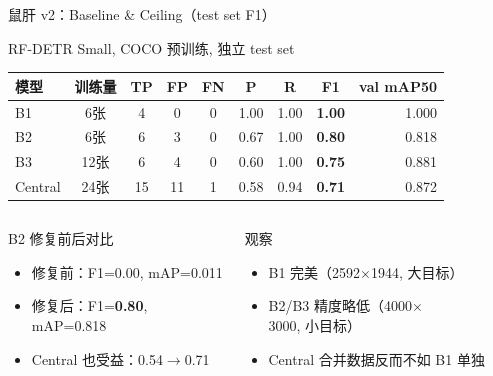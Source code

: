 \documentclass[aspectratio=169, 10pt]{beamer}
\begin{document}
\begin{frame}{鼠肝 v2：Baseline \& Ceiling（test set F1）}
  \begin{block}{RF-DETR Small, COCO 预训练, 独立 test set}
    \begin{tabular}{lcccccccr}
      \toprule
      \textbf{模型} & \textbf{训练量} & \textbf{TP} & \textbf{FP} & \textbf{FN} & \textbf{P} & \textbf{R} & \textbf{F1} & \textbf{val mAP50} \\
      \midrule
      B1 & 6张 & 4 & 0 & 0 & 1.00 & 1.00 & \textbf{1.00} & 1.000 \\
      B2 & 6张 & 6 & 3 & 0 & 0.67 & 1.00 & \textbf{0.80} & 0.818 \\
      B3 & 12张 & 6 & 4 & 0 & 0.60 & 1.00 & \textbf{0.75} & 0.881 \\
      Central & 24张 & 15 & 11 & 1 & 0.58 & 0.94 & \textbf{0.71} & 0.872 \\
      \bottomrule
    \end{tabular}
  \end{block}
  \vspace{0em}
  \begin{columns}[T]
    \begin{alertblock}{B2 修复前后对比}
      \begin{itemize}
        \item 修复前：F1=\alert{0.00}, mAP=0.011
        \item 修复后：F1=\textbf{0.80}, mAP=0.818
        \item Central 也受益：0.54$\to$0.71
      \end{itemize}
    \end{alertblock}
    \begin{block}{观察}
      \begin{itemize}
        \item B1 完美（2592$\times$1944, 大目标）
        \item B2/B3 精度略低（4000$\times$3000, 小目标）
        \item Central 合并数据反而不如 B1 单独
      \end{itemize}
    \end{block}
  \end{columns}
\end{frame}
\end{document}
